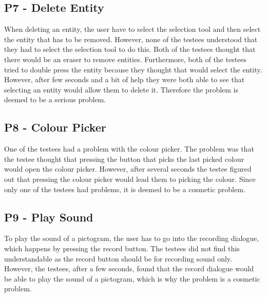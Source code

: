 \subsection*{P7 - Delete Entity}
When deleting an entity, the user have to select the selection tool and then select the entity that has to be removed.
However, none of the testees understood that they had to select the selection tool to do this.
Both of the testees thought that there would be an eraser to remove entities.
Furthermore, both of the testees tried to double press the entity because they thought that would select the entity.
However, after few seconds and a bit of help they were both able to see that selecting an entity would allow them to delete it.
Therefore the problem is deemed to be a serious problem. 

\subsection*{P8 - Colour Picker}
One of the testees had a problem with the colour picker.
The problem was that the testee thought that pressing the button that picks the last picked colour would open the colour picker.
However, after several seconds the testee figured out that pressing the colour picker would lead them to picking the colour.
Since only one of the testees had problems, it is deemed to be a cosmetic problem.

\subsection*{P9 - Play Sound}
To play the sound of a pictogram, the user has to go into the recording dialogue, which happens by pressing the record button.
The testees did not find this understandable as the record button should be for recording sound only.
However, the testees, after a few seconds, found that the record dialogue would be able to play the sound of a pictogram, which is why the problem is a cosmetic problem.
